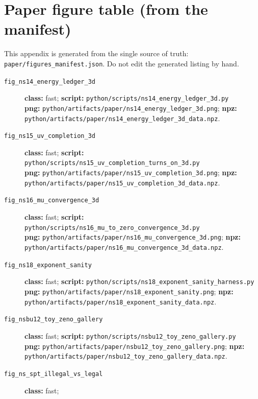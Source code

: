 \documentclass[11pt]{article}
\begin{document}
 \clearpage
\section{Paper figure table (from the manifest)}\label{app:figure-table}

This appendix is generated from the single source of truth:
\nolinkurl{paper/figures_manifest.json}.
Do not edit the generated listing by hand.

{\small\raggedright
\begin{description}
\item[\texttt{fig\_ns14\_energy\_ledger\_3d}] \textbf{class:} fast;
  \textbf{script:} \nolinkurl{python/scripts/ns14_energy_ledger_3d.py}\\
  \textbf{png:} \nolinkurl{python/artifacts/paper/ns14_energy_ledger_3d.png};
  \textbf{npz:} \nolinkurl{python/artifacts/paper/ns14_energy_ledger_3d_data.npz}.
\item[\texttt{fig\_ns15\_uv\_completion\_3d}] \textbf{class:} fast;
  \textbf{script:} \nolinkurl{python/scripts/ns15_uv_completion_turns_on_3d.py}\\
  \textbf{png:} \nolinkurl{python/artifacts/paper/ns15_uv_completion_3d.png};
  \textbf{npz:} \nolinkurl{python/artifacts/paper/ns15_uv_completion_3d_data.npz}.
\item[\texttt{fig\_ns16\_mu\_convergence\_3d}] \textbf{class:} fast;
  \textbf{script:} \nolinkurl{python/scripts/ns16_mu_to_zero_convergence_3d.py}\\
  \textbf{png:} \nolinkurl{python/artifacts/paper/ns16_mu_convergence_3d.png};
  \textbf{npz:} \nolinkurl{python/artifacts/paper/ns16_mu_convergence_3d_data.npz}.
\item[\texttt{fig\_ns18\_exponent\_sanity}] \textbf{class:} fast;
  \textbf{script:} \nolinkurl{python/scripts/ns18_exponent_sanity_harness.py}\\
  \textbf{png:} \nolinkurl{python/artifacts/paper/ns18_exponent_sanity.png};
  \textbf{npz:} \nolinkurl{python/artifacts/paper/ns18_exponent_sanity_data.npz}.
\item[\texttt{fig\_nsbu12\_toy\_zeno\_gallery}] \textbf{class:} fast;
  \textbf{script:} \nolinkurl{python/scripts/nsbu12_toy_zeno_gallery.py}\\
  \textbf{png:} \nolinkurl{python/artifacts/paper/nsbu12_toy_zeno_gallery.png};
  \textbf{npz:} \nolinkurl{python/artifacts/paper/nsbu12_toy_zeno_gallery_data.npz}.
\item[\texttt{fig\_ns\_spt\_illegal\_vs\_legal}] \textbf{class:} fast;

\end{description}}
\end{document}
